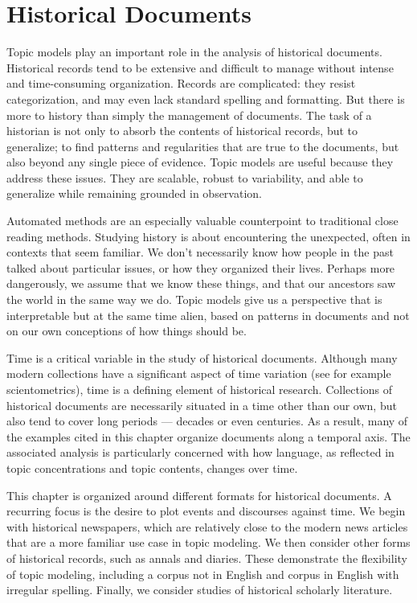 
\chapter{Historical Documents}
\label{ch:nonfiction}

Topic models play an important role in the analysis of historical documents.
Historical records tend to be extensive and difficult to manage without intense and time-consuming organization.
Records are complicated: they resist categorization, and may even lack standard spelling and formatting.
But there is more to history than simply the management of documents.
The task of a historian is not only to absorb the contents of historical records, but to generalize; to find patterns and regularities that are true to the documents, but also beyond any single piece of evidence.
Topic models are useful because they address these issues. They are scalable, robust to variability, and able to generalize while remaining grounded in observation.

Automated methods are an especially valuable counterpoint to traditional close reading methods.
Studying history is about encountering the unexpected, often in contexts that seem familiar.
We don't necessarily know how people in the past talked about particular issues, or how they organized their lives.
Perhaps more dangerously, we assume that we know these things, and that our ancestors saw the world in the same way we do.
Topic models give us a perspective that is interpretable but at the same time alien, based on patterns in documents and not on our own conceptions of how things should be.

Time is a critical variable in the study of historical documents.
Although many modern collections have a significant aspect of time variation (see for example scientometrics), time is a defining element of historical research.
Collections of historical documents are necessarily situated in a time other than our own, but also tend to cover long periods --- decades or even centuries.
As a result, many of the examples cited in this chapter organize documents along a temporal axis.
The associated analysis is particularly concerned with how language, as reflected in topic concentrations and topic contents, changes over time.

This chapter is organized around different formats for historical documents.
A recurring focus is the desire to plot events and discourses against time.
We begin with historical newspapers, which are relatively close to the modern news articles that are a more familiar use case in topic modeling.
We then consider other forms of historical records, such as annals and diaries.
These demonstrate the flexibility of topic modeling, including a corpus not in English and corpus in English with irregular spelling.
Finally, we consider studies of historical scholarly literature.

